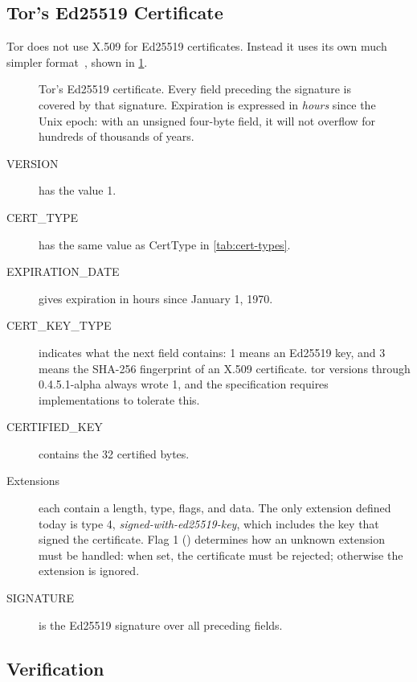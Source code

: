 \subsection{Tor's Ed25519 Certificate}

Tor does not use X.509 for Ed25519 certificates. Instead it uses its own much simpler format~, shown in \cref{fig:cert-ed}.

\begin{figure}[htbp]
\centering

\caption{Tor's Ed25519 certificate. Every field preceding the signature is covered by that signature. Expiration is expressed in \emph{hours} since the Unix epoch: with an unsigned four-byte field, it will not overflow for hundreds of thousands of years.}
\label{fig:cert-ed}
\end{figure}

\begin{description}
  \item[VERSION] has the value 1.
  \item[CERT\_TYPE] has the same value as CertType in \cref{tab:cert-types}.
  \item[EXPIRATION\_DATE] gives expiration in hours since January 1, 1970.
  \item[CERT\_KEY\_TYPE] indicates what the next field contains: 1 means an Ed25519 key, and 3 means the SHA-256 fingerprint of an X.509 certificate. tor versions through 0.4.5.1-alpha always wrote 1, and the specification requires implementations to tolerate this.
  \item[CERTIFIED\_KEY] contains the 32 certified bytes.
  \item[Extensions] each contain a length, type, flags, and data. The only extension defined today is type 4, \emph{signed-with-ed25519-key}, which includes the key that signed the certificate. Flag 1 () determines how an unknown extension must be handled: when set, the certificate must be rejected; otherwise the extension is ignored.
  \item[SIGNATURE] is the Ed25519 signature over all preceding fields.
\end{description}

\subsection{Verification}\label{sec:canale-verifica}

